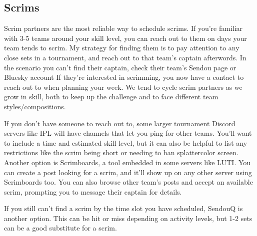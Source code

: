 \documentclass[12pt]{article}
\begin{document}
\subsection{Scrims}
Scrim partners are the most reliable way to schedule scrims. If you're familiar with 3-5 teams around your skill level, you can reach out to them on days your team tends to scrim. My strategy for finding them is to pay attention to any close sets in a tournament, and reach out to that team's captain afterwords. In the scenario you can't find their captain, check their team's Sendou page or Bluesky account If they're interested in scrimming, you now have a contact to reach out to when planning your week. We tend to cycle scrim partners as we grow in skill, both to keep up the challenge and to face different team styles/compositions.

If you don't have someone to reach out to, some larger tournament Discord servers like IPL will have channels that let you ping for other teams. You'll want to include a time and estimated skill level, but it can also be helpful to list any restrictions like the scrim being short or needing to ban splattercolor screen. Another option is Scrimboards, a tool embedded in some servers like LUTI. You can create a post looking for a scrim, and it'll show up on any other server using Scrimboards too. You can also browse other team's posts and accept an available scrim, prompting you to message their captain for details. 

If you still can't find a scrim by the time slot you have scheduled, SendouQ is another option. This can be hit or miss depending on activity levels, but 1-2 sets can be a good substitute for a scrim.
\end{document}
